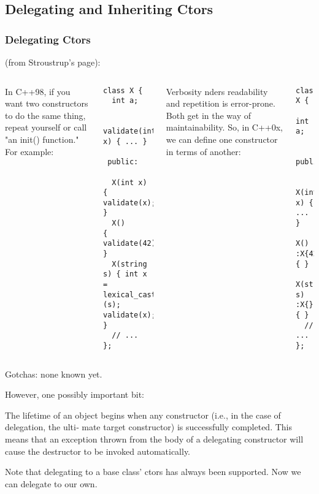 
\subsection{Delegating and Inheriting Ctors}
\lyxframeend{}


\begin{frame}[fragile]
\frametitle{Delegating Ctors}
(from Stroustrup's page):
\begin{columns}[t]
{\scriptsize
In C++98, if you want two constructors to do the same thing, repeat yourself or call "an init() function." For example:

\begin{verbatim}  
class X {
  int a;

  validate(int x) { ... }

 public:

  X(int x) { validate(x); }
  X()      { validate(42); }
  X(string s) { int x = lexical_cast<int>(s); validate(x); }
  // ...
};
\end{verbatim}
}

{\scriptsize

Verbosity nders readability and repetition is error-prone. Both get in
the way of maintainability. So, in C++0x, we can define one
constructor in terms of another:

\begin{verbatim} 
class X {
  int a;

 public:

  X(int x) { ...  }
  X() :X{42} { }
  X(string s) :X{} { }
  // ...
};
\end{verbatim}
}
\end{columns}

Gotchas: none known yet.

However, one possibly important bit:

The lifetime of an object begins when any constructor (i.e., in the
case of delegation, the ulti‐ mate target constructor) is successfully
completed. This means that an exception thrown from the body of a
delegating constructor will cause the destructor to be invoked
automatically.

Note that delegating to a base class' ctors has always been
supported.  Now we can delegate to our own.


\end{frame}

